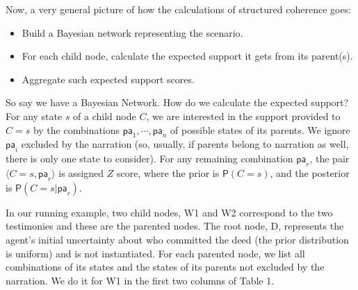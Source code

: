 \documentclass[10pt,]{scrartcl}
\newcommand{\ra}{\rangle}
\newcommand{\la}{\langle}
\newcommand{\pr}{\mathsf{P}}
\begin{document}
Now, a very general picture of how the calculations of structured coherence  goes:

\begin{itemize}
    \item Build a Bayesian network representing the scenario.
    \item For each child node, calculate the expected support it gets from its parent(s). 
    \item Aggregate such expected support scores.
\end{itemize}


So say we have a Bayesian Network. How do we calculate the expected support? For any state \(s\) of
a child node \(C\), we are interested in the
support provided to \(C=s\) by the combinations
\(\mathsf{pa}_1, \cdots, \mathsf{pa}_n\) of possible states of its
parents. We ignore \(\mathsf{pa}_i\) excluded by the narration (so, usually, if parents belong to narration as well, there is only one state to consider). For any
remaining combination \(\mathsf{pa}_r\), the pair
\(\la C=s, \mathsf{pa}_r\ra\) is assigned  $Z$ score, where the prior is $\pr(C=s)$, and the posterior is $\pr(C=s \vert \mathsf{pa}_r)$.

In our running example, two child nodes, \textsf{W1} and
\textsf{W2} correspond to the two testimonies and these are the parented  nodes.
 The root node, \textsf{D},
 represents the agent's initial uncertainty about who
committed the deed (the prior distribution is uniform) and is not
instantiated. 
For each parented node,  we list all combinations  of its states and the states of its parents not excluded by the narration. We do it for \textsf{W1} in the first two columns of Table 1.
\end{document}
